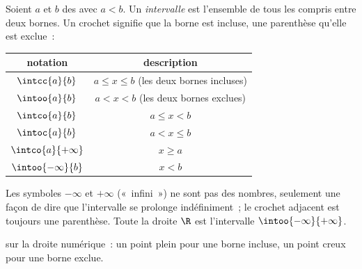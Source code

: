 \begin{definition}[Intervalle]\label{def:g10:numbers:interval}
Soient $a$ et $b$ des  avec $a < b$. Un
\emph{intervalle} est l'ensemble de tous les  compris entre deux bornes. Un crochet signifie que la borne est
incluse, une parenthèse qu'elle est exclue~:
\begin{center}
\begin{tabular}{c|c}
notation & description \\
\hline
$\intcc{a}{b}$ & $a \leq x \leq b$ (les deux bornes incluses) \\
$\intoo{a}{b}$ & $a < x < b$ (les deux bornes exclues) \\
$\intco{a}{b}$ & $a \leq x < b$ \\
$\intoc{a}{b}$ & $a < x \leq b$ \\
$\intco{a}{+\infty}$ & $x \geq a$ \\
$\intoo{-\infty}{b}$ & $x < b$ \\
\end{tabular}
\end{center}
Les symboles $-\infty$ et $+\infty$ («~infini~») ne sont pas des
nombres, seulement une façon de dire que l'intervalle se prolonge
indéfiniment~; le crochet adjacent est toujours une parenthèse. Toute
la droite $\R$ est l'intervalle $\intoo{-\infty}{+\infty}$.
\end{definition}

\begin{omfigure}

{\small {} sur la droite numérique~: un point plein pour une
borne incluse, un point creux pour une borne exclue.}
\end{omfigure}

